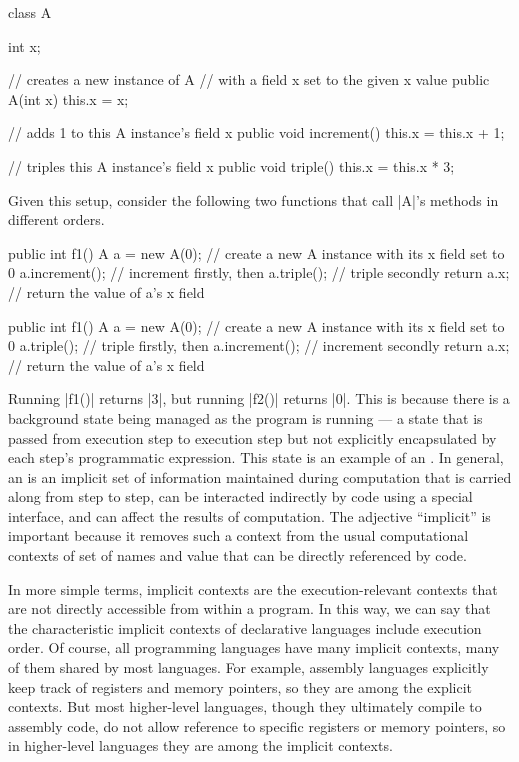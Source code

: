 \begin{snippet-Java}
class A {
  int x;

  // creates a new instance of A
  // with a field x set to the given x value
  public A(int x) {
    this.x = x;
  }

  // adds 1 to this A instance's field x
  public void increment() {
    this.x = this.x + 1;
  }

  // triples this A instance's field x
  public void triple() {
    this.x = this.x * 3;
  }
}
\end{snippet-Java}
Given this setup, consider the following two functions that call \code|A|'s methods in different orders.
\begin{snippet-Java}
public int f1() {
  A a = new A(0); // create a new A instance with its x field set to 0
  a.increment();  // increment firstly, then
  a.triple();     // triple secondly
  return a.x;     // return the value of a's x field
}

public int f1() {
  A a = new A(0); // create a new A instance with its x field set to 0
  a.triple();     // triple firstly, then
  a.increment();  // increment secondly
  return a.x;     // return the value of a's x field
}
\end{snippet-Java}

Running \code|f1()| returns \code|3|, but
running \code|f2()| returns \code|0|.
This is because there is a background state being managed as the program is running --- a state that is passed from execution step to execution step but not explicitly encapsulated by each step's programmatic expression.
This state is an example of an .
In general, an  is an implicit set of information maintained during computation that
is carried along from step to step,
can be interacted indirectly by code using a special interface, and
can affect the results of computation.
The adjective ``implicit'' is important because it removes such a context from the usual computational contexts of set of names and value that can be directly referenced by code.

In more simple terms, implicit contexts are the execution-relevant contexts that are not directly accessible from within a program.
In this way, we can say that the characteristic implicit contexts of declarative languages include execution order.
Of course, all programming languages have many implicit contexts, many of them shared by most languages.
For example, assembly languages explicitly keep track of registers and memory pointers, so they are among the explicit contexts.
But most higher-level languages, though they ultimately compile to assembly code, do not allow reference to specific registers or memory pointers, so in higher-level languages they are among the implicit contexts.

